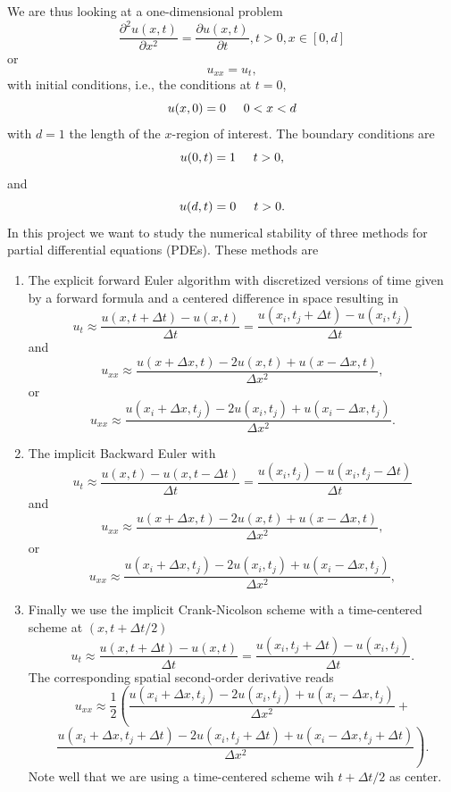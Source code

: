 \documentclass{article}
\begin{document}
We are thus looking at a one-dimensional
problem 
\[
 \frac{\partial^2 u(x,t)}{\partial x^2} =\frac{\partial u(x,t)}{\partial t}, t> 0, x\in [0,d]
\]
or 
\[
u_{xx} = u_t,
\]
with initial conditions, i.e., the conditions at $t=0$, 
\[
u(x,0)= 0 \hspace{0.5cm} 0 < x < d
\]
with $d=1$ the length of the $x$-region of interest. The 
boundary conditions are 
\[
u(0,t)= 1 \hspace{0.5cm} t > 0,
\]
and 
\[
u(d,t)= 0 \hspace{0.5cm} t > 0.
\]
In this project we want to study the numerical stability of three methods for partial differential equations
(PDEs). 
These methods are 
\begin{enumerate}
\item The explicit forward Euler algorithm with discretized versions of time given by a forward formula and
a centered difference in space resulting in
 \[
u_t\approx \frac{u(x,t+\Delta t)-u(x,t)}{\Delta t}=\frac{u(x_i,t_j+\Delta t)-u(x_i,t_j)}{\Delta t}
\]
and
\[
u_{xx}\approx \frac{u(x+\Delta x,t)-2u(x,t)+u(x-\Delta x,t)}{\Delta x^2},
\]
or
\[
u_{xx}\approx \frac{u(x_i+\Delta x,t_j)-2u(x_i,t_j)+u(x_i-\Delta x,t_j)}{\Delta x^2}.
\]
\item The implicit Backward Euler with
 \[
u_t\approx \frac{u(x,t)-u(x,t-\Delta t)}{\Delta t}=\frac{u(x_i,t_j)-u(x_i,t_j-\Delta t)}{\Delta t}
\]
and
\[
u_{xx}\approx \frac{u(x+\Delta x,t)-2u(x,t)+u(x-\Delta x,t)}{\Delta x^2},
\]
or
\[
u_{xx}\approx \frac{u(x_i+\Delta x,t_j)-2u(x_i,t_j)+u(x_i-\Delta x,t_j)}{\Delta x^2},
\]
\item Finally we use the implicit Crank-Nicolson scheme with 
a time-centered scheme at $(x,t+\Delta t/2)$
 \[
u_t\approx \frac{u(x,t+\Delta t)-u(x,t)}{\Delta t}=\frac{u(x_i,t_j+\Delta t)-u(x_i,t_j)}{\Delta t}.
\]
The corresponding spatial second-order derivative reads
\[
u_{xx}\approx \frac{1}{2}\left(\frac{u(x_i+\Delta x,t_j)-2u(x_i,t_j)+u(x_i-\Delta x,t_j)}{\Delta x^2}+\right.
\]
\[
\left. \frac{u(x_i+\Delta x,t_j+\Delta t)-2u(x_i,t_j+\Delta t)+u(x_i-\Delta x,t_j+\Delta t)}{\Delta x^2}
\right).
\] 
Note well that we are using a time-centered scheme wih $t+\Delta t/2$ as center.
\end{enumerate}
\end{document}
